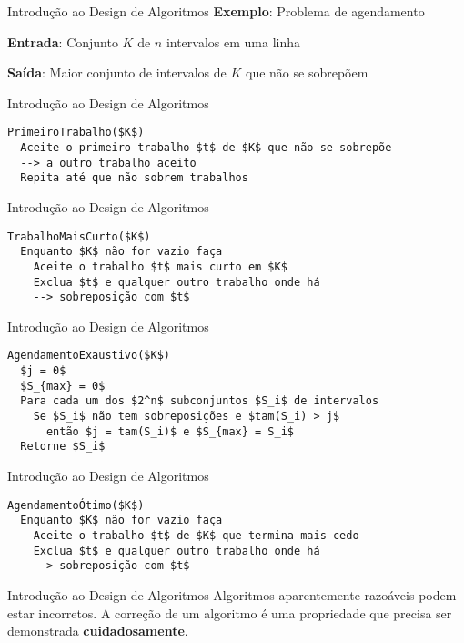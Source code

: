 \begin{frame}{Introdução ao Design de Algoritmos}
    \huge
    \textbf{Exemplo}: Problema de agendamento
    
    \Large
    \textbf{Entrada}: Conjunto $K$ de $n$ intervalos em uma linha

    \textbf{Saída}: Maior conjunto de intervalos de $K$ que não se sobrepõem
\end{frame}

\begin{frame}[fragile]{Introdução ao Design de Algoritmos}
    \begin{lstlisting}
PrimeiroTrabalho($K$)
  Aceite o primeiro trabalho $t$ de $K$ que não se sobrepõe
  --> a outro trabalho aceito
  Repita até que não sobrem trabalhos
    \end{lstlisting}
\end{frame}

\begin{frame}[fragile]{Introdução ao Design de Algoritmos}
    \begin{lstlisting}
TrabalhoMaisCurto($K$)
  Enquanto $K$ não for vazio faça
    Aceite o trabalho $t$ mais curto em $K$
    Exclua $t$ e qualquer outro trabalho onde há
    --> sobreposição com $t$
    \end{lstlisting}
\end{frame}

\begin{frame}[fragile]{Introdução ao Design de Algoritmos}
    \begin{lstlisting}
AgendamentoExaustivo($K$)
  $j = 0$
  $S_{max} = 0$
  Para cada um dos $2^n$ subconjuntos $S_i$ de intervalos
    Se $S_i$ não tem sobreposições e $tam(S_i) > j$
      então $j = tam(S_i)$ e $S_{max} = S_i$
  Retorne $S_i$
    \end{lstlisting}
\end{frame}

\begin{frame}[fragile]{Introdução ao Design de Algoritmos}
    \begin{lstlisting}
AgendamentoÓtimo($K$)
  Enquanto $K$ não for vazio faça
    Aceite o trabalho $t$ de $K$ que termina mais cedo
    Exclua $t$ e qualquer outro trabalho onde há
    --> sobreposição com $t$
    \end{lstlisting}
\end{frame}

\begin{frame}{Introdução ao Design de Algoritmos}
    \huge
    Algoritmos aparentemente razoáveis podem estar incorretos. A correção de um algoritmo é uma propriedade que precisa ser demonstrada \textbf{cuidadosamente}.
\end{frame}

